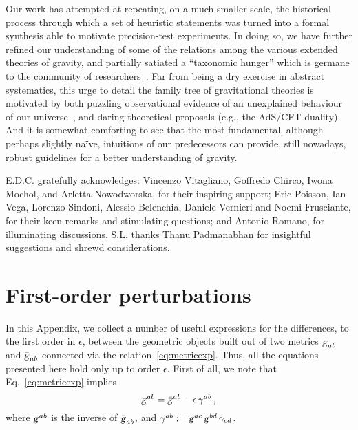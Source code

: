 \documentclass[a4paper,showkeys,aps,prd,reprint,nofootinbib,showpacs,twocolumn]{revtex4-1}
\newcommand{\eq}[1]{\( #1 \)}
\newcommand{\eqd}[1]{\begin{equation} #1 \end{equation}}
\newcommand{\matg}{\text{\textsl{g}}}%
\theoremstyle{plain}
\begin{document}
Our work has attempted at repeating, on a much smaller scale, the historical process through which a set of heuristic statements was turned into a  formal synthesis able to motivate precision-test experiments. In doing so, we have further refined our understanding of some of the relations among the various extended theories of gravity, and partially satiated a ``taxonomic hunger'' which is germane to the community of researchers~\cite{Sotiriou:2007zu}. Far from being a dry exercise in abstract systematics, this urge to detail the family tree of gravitational theories is motivated by both puzzling observational evidence of an unexplained behaviour of our universe~\cite{Ade:2013zuv}, and daring theoretical proposals (e.g., the AdS/CFT duality). And it is somewhat comforting to see that the most fundamental, although perhaps slightly na{\"i}ve, intuitions of our predecessors can provide, still nowadays, robust guidelines for a better understanding of gravity.

\begin{acknowledgments}
E.D.C. gratefully acknowledges: Vincenzo Vitagliano, Goffredo Chirco, Iwona Mochol, and Arletta Nowodworska, for their inspiring support; Eric Poisson, Ian Vega, Lorenzo Sindoni, Alessio Belenchia, Daniele Vernieri and Noemi Frusciante, for their keen remarks and stimulating questions; and Antonio Romano, for illuminating discussions. S.L. thanks Thanu Padmanabhan for insightful suggestions and shrewd considerations.
\end{acknowledgments}


\appendix

\section{First-order perturbations}
\label{App:A}

In this Appendix, we collect a number of useful expressions for the differences, to the first order in \eq{\epsilon}, between the geometric objects built out of two metrics \eq{\matg_{ab}} and \eq{\bar{\matg}_{ab}} connected via the relation~\eqref{eq:metricexp}.  Thus, all the equations presented here hold only up to order \eq{\epsilon}.  First of all, we note that Eq.~\eqref{eq:metricexp} implies 
%
\eqd{\matg^{ab} = \bar{\matg}^{ab} - \epsilon \, \gamma^{ab} \,, \label{invg}}
%
where \eq{\bar{\matg}^{ab}} is the inverse of \eq{\bar{\matg}_{ab}}, and \eq{\gamma^{ab} := \bar{\matg}^{ac} \, \bar{\matg}^{bd} \, \gamma_{cd}}.  
\end{document}

